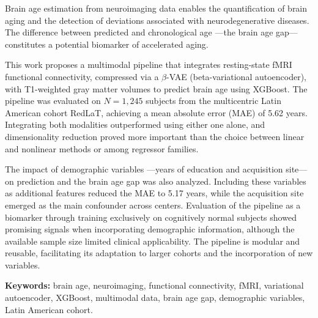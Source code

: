 Brain age estimation from neuroimaging data enables the quantification of brain aging and the detection of deviations associated with neurodegenerative diseases. The difference between predicted and chronological age ---the brain age gap--- constitutes a potential biomarker of accelerated aging.

This work proposes a multimodal pipeline that integrates resting-state fMRI functional connectivity, compressed via a $\beta$-VAE (beta-variational autoencoder), with T1-weighted gray matter volumes to predict brain age using XGBoost. The pipeline was evaluated on $N = 1{,}245$ subjects from the multicentric Latin American cohort RedLaT, achieving a mean absolute error (MAE) of 5.62 years. Integrating both modalities outperformed using either one alone, and dimensionality reduction proved more important than the choice between linear and nonlinear methods or among regressor families.

The impact of demographic variables ---years of education and acquisition site--- on prediction and the brain age gap was also analyzed. Including these variables as additional features reduced the MAE to 5.17 years, while the acquisition site emerged as the main confounder across centers. Evaluation of the pipeline as a biomarker through training exclusively on cognitively normal subjects showed promising signals when incorporating demographic information, although the available sample size limited clinical applicability. The pipeline is modular and reusable, facilitating its adaptation to larger cohorts and the incorporation of new variables.

\vspace{1em}
\noindent\textbf{Keywords:} brain age, neuroimaging, functional connectivity, fMRI, variational autoencoder, XGBoost, multimodal data, brain age gap, demographic variables, Latin American cohort.
